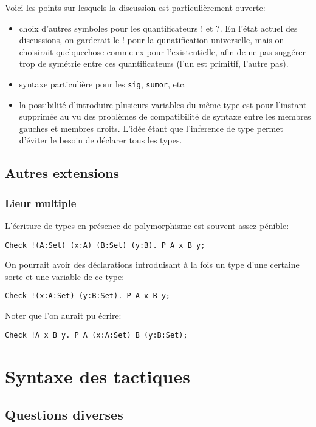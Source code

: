\documentclass{article}
\def\TERM#1{\textsf{#1}}
\begin{document}
Voici les points sur lesquels la discussion est particulièrement
ouverte:
\begin{itemize}
\item choix d'autres symboles pour les quantificateurs \TERM{!} et
  \TERM{?}. En l'état actuel des discussions, on garderait le \TERM{!}
  pour la qunatification universelle, mais on choisirait quelquechose
  comme \TERM{ex} pour l'existentielle, afin de ne pas suggérer trop
  de symétrie entre ces quantificateurs (l'un est primitif, l'autre
  pas).
\item syntaxe particulière pour les \texttt{sig}, \texttt{sumor}, etc.
\item la possibilité d'introduire plusieurs variables du même type est
  pour l'instant supprimée au vu des problèmes de compatibilité de
  syntaxe entre les membres gauches et membres droits. L'idée étant
  que l'inference de type permet d'éviter le besoin de déclarer tous
  les types.
\end{itemize}

\subsection{Autres extensions}

\subsubsection{Lieur multiple}

L'écriture de types en présence de polymorphisme est souvent assez
pénible:
\begin{verbatim}
Check !(A:Set) (x:A) (B:Set) (y:B). P A x B y;
\end{verbatim}

On pourrait avoir des déclarations introduisant à la fois un type
d'une certaine sorte et une variable de ce type:
\begin{verbatim}
Check !(x:A:Set) (y:B:Set). P A x B y;
\end{verbatim}

Noter que l'on aurait pu écrire:
\begin{verbatim}
Check !A x B y. P A (x:A:Set) B (y:B:Set);
\end{verbatim}

\section{Syntaxe des tactiques}

\subsection{Questions diverses}
\end{document}
